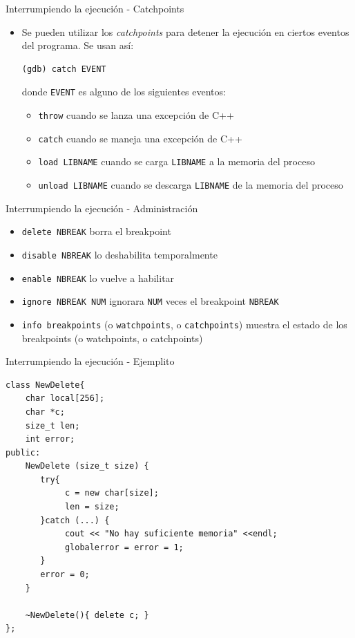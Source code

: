 \documentclass[xetex]{beamer}
\begin{document}
\begin{frame}[fragile]{Interrumpiendo la ejecución - Catchpoints}
\begin{itemize}
\item Se pueden utilizar los {\it catchpoints} para detener la ejecución en ciertos eventos del programa. Se usan así:
\begin{verbatim} 
(gdb) catch EVENT
\end{verbatim} 
donde \verb=EVENT= es alguno de los siguientes eventos:
\begin{itemize}
\item \verb=throw= cuando se lanza una excepción de C++
\item \verb=catch= cuando se maneja una excepción de C++
\item \verb=load LIBNAME= cuando se carga \verb=LIBNAME=  a la memoria del proceso
\item \verb=unload LIBNAME=  cuando se descarga \verb=LIBNAME= de la memoria del proceso
\end{itemize}
\end{itemize}
\end{frame}

\begin{frame}[fragile]{Interrumpiendo la ejecución - Administración}
\begin{itemize}

\item \verb=delete NBREAK= borra el breakpoint
\item \verb=disable NBREAK= lo deshabilita temporalmente
\item \verb=enable NBREAK=  lo vuelve a habilitar 
\item \verb=ignore NBREAK NUM= ignorara \verb=NUM= veces el breakpoint \verb=NBREAK=  
\item \verb=info breakpoints= (o \verb=watchpoints=, o \verb=catchpoints=) muestra el estado de los breakpoints (o watchpoints, o catchpoints)
\end{itemize}
\end{frame}

\begin{frame}[fragile]{Interrumpiendo la ejecución - Ejemplito}
\begin{lstlisting}
class NewDelete{
    char local[256];
    char *c;
    size_t len;
    int error;
public:
    NewDelete (size_t size) {
       try{
            c = new char[size];
            len = size;
       }catch (...) {
            cout << "No hay suficiente memoria" <<endl;
            globalerror = error = 1;
       }
       error = 0;
    }

    ~NewDelete(){ delete c; }
};
\end{lstlisting}
\end{frame}
\end{document}
